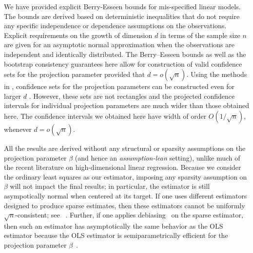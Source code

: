 \documentclass[11pt]{article}
\begin{document}
We have provided explicit Berry-Esseen bounds
for mis-specified linear models. The bounds are
derived based on deterministic inequalities that do not
require any specific independence or dependence assumptions
on the observations. 
Explicit requirements on the growth of dimension $d$ 
in terms of the sample size $n$ are given for an asymptotic
normal approximation when the observations are independent
and identically distributed. 
The Berry--Esseen bounds as well as the bootstrap consistency guarantees here allow for construction of valid confidence sets
for the projection parameter provided that $d = o(\sqrt{n})$. 
Using the methods in
\cite{kuchibhotla2018valid}, confidence sets for the projection parameters can be constructed even for larger $d$ .
However, these sets are not rectangles and the projected
confidence intervals for individual projection parameters 
are much wider than those obtained here. The confidence 
intervals we obtained here have width of order $O(1/\sqrt{n})$,
whenever $d = o(\sqrt{n})$.

All the results are derived without any structural or sparsity assumptions on the projection parameter $\beta$ (and hence an \emph{assumption-lean} setting), unlike much of the recent literature on high-dimensional linear regression. Because we consider the ordinary least squares as our estimator, imposing any sparsity assumption on $\beta$ will not impact the final results; in particular, the estimator is still asympotically normal when centered at its target. If one uses different estimators designed to produce sparse estimates, then these estimators cannot be uniformly $\sqrt{n}$-consistent; see ~\cite{potscher2009confidence}. Further, if one applies debiasing~\citep{javanmard2014confidence,vandegeer2014asymptotically,zhang2014confidence} on the sparse estimator, then such an estimator has asymptotically the same behavior as the OLS estimator because the OLS estimator is semiparametrically efficient for the projection parameter $\beta$~\cite[Example 5]{Levit76}. 
\end{document}

